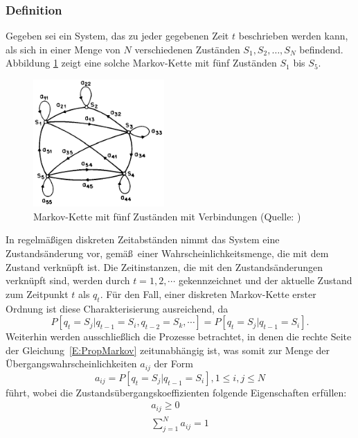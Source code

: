 \subsubsection{Definition}
Gegeben sei ein System, das zu jeder gegebenen Zeit $t$ beschrieben werden kann, als sich in einer Menge von $N$ verschiedenen Zust\"anden
$S_1, S_2, \ldots, S_N$ befindend. Abbildung \ref{fig:MarkovKette} zeigt eine solche Markov-Kette mit f\"unf Zust\"anden $S_1$ bis $S_5$.
\begin{figure}[htb]
\centering
\includegraphics[width=5cm]{img/markov/markov_chain.png}
\caption[Markov-Kette mit f\"unf Zust\"anden]{Markov-Kette mit f\"unf Zust\"anden  mit Verbindungen (Quelle: )}
\label{fig:MarkovKette}
\end{figure}
In regelm\"a\ss igen diskreten Zeitabst\"anden nimmt das System eine Zustands\"anderung vor, gem\"a\ss~einer Wahrscheinlichkeitsmenge, die mit dem Zustand verkn\"upft ist. Die Zeitinstanzen, die mit den Zustands\"anderungen verkn\"upft sind, werden durch $t = 1, 2, \cdots$ gekennzeichnet und der aktuelle Zustand zum Zeitpunkt $t$ als $q_t$. F\"ur den Fall, einer diskreten Markov-Kette erster Ordnung ist diese Charakterisierung ausreichend, da
\begin{equation}
\label{E:PropMarkov}
P[q_t = S_j | q_{t-1} = S_i, q_{t-2} = S_k, \cdots]= P[q_t = S_j | q_{t-1} = S_i].
\end{equation}
Weiterhin werden ausschlie\ss lich die Prozesse betrachtet, in denen die rechte Seite der Gleichung~\ref{E:PropMarkov} zeitunabh\"angig ist, was somit zur Menge der \"Ubergangswahrscheinlichkeiten $a_{ij}$ der Form
\begin{equation}
\label{E:PropTrans}
a_{ij} = P[q_t = S_j | q_{t-1} = S_i], 1 \leq i, j \leq N
\end{equation}
f\"uhrt, wobei die Zustands\"ubergangskoeffizienten folgende Eigenschaften erf\"ullen:
\begin{subequations}
\begin{align}
\label{E:MarkovProperties}
a_{ij} \geq 0 \\
\sum_{j = 1}^{N} a_{ij} = 1
\end{align}
\end{subequations}
